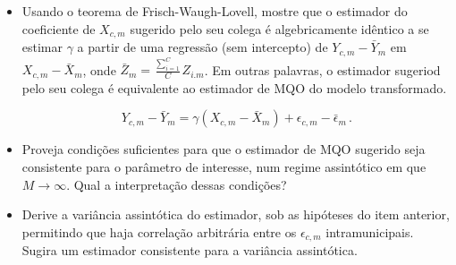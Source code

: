\documentclass[10pt,a4paper]{article}
\begin{document}
 \begin{itemize}
 	\item[b] Usando o teorema de Frisch-Waugh-Lovell, mostre que o estimador do coeficiente de $X_{c,m}$ sugerido pelo seu colega é algebricamente idêntico a se estimar $\gamma$ a partir de uma regressão (sem intercepto) de $Y_{c,m} - \bar{Y}_m$ em $X_{c,m} - \bar{X}_m$, onde $\bar{Z}_m = \frac{\sum_{i=1}^{C}}{C} Z_{i.m}$. Em outras palavras, o estimador sugeriod pelo seu colega é equivalente ao estimador de MQO do modelo transformado.
 	
 	$$Y_{c,m} - \bar{Y}_m = \gamma (X_{c,m}-\bar{X}_m) + \epsilon_{c,m}-\bar{\epsilon}_m\, .$$
 	
 	\item[c] Proveja condições suficientes para que o estimador de MQO sugerido seja consistente para o parâmetro de interesse, num regime assintótico em que $M \to \infty$. Qual a interpretação dessas condições?
 	
 	\item[d] Derive a variância assintótica do estimador, sob as hipóteses do item anterior, permitindo que haja correlação arbitrária entre os $\epsilon_{c,m}$ intramunicipais. Sugira um estimador consistente para a variância assintótica.
 \end{itemize}
 
\end{document}
